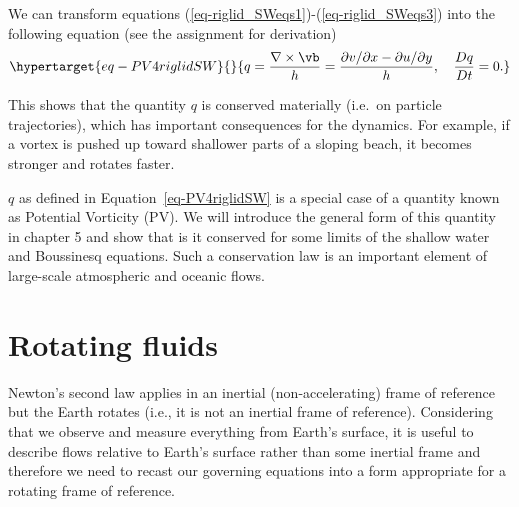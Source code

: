 \documentclass[
  letterpaper,
  twocolumn,
  landscape]{report}
\begin{document}
We can transform equations
(\ref{eq-riglid_SWeqs1})-(\ref{eq-riglid_SWeqs3}) into the following
equation (see the assignment for derivation)
\begin{equation}\protect\hypertarget{eq-PV4riglidSW}{}{q = \frac{\nabla \times \vb}{h} = \frac{\partial v/\partial x - \partial u/\partial y}{h}, \quad  \frac{D q}{D t} = 0. }\label{eq-PV4riglidSW}\end{equation}

This shows that the quantity \(q\) is conserved materially (i.e.~on
particle trajectories), which has important consequences for the
dynamics. For example, if a vortex is pushed up toward shallower parts
of a sloping beach, it becomes stronger and rotates faster.

\begin{tcolorbox}[enhanced jigsaw, toprule=.15mm, left=2mm, opacityback=0, breakable, arc=.35mm, colback=white, rightrule=.15mm, bottomrule=.15mm, colframe=quarto-callout-note-color-frame, leftrule=.75mm]
\begin{minipage}[t]{5.5mm}
\textcolor{quarto-callout-note-color}{\faInfo}
\end{minipage}%
\begin{minipage}[t]{\textwidth - 5.5mm}

\(q\) as defined in Equation~\ref{eq-PV4riglidSW} is a special case of a
quantity known as Potential Vorticity (PV). We will introduce the
general form of this quantity in chapter 5 and show that is it conserved
for some limits of the shallow water and Boussinesq equations. Such a
conservation law is an important element of large-scale atmospheric and
oceanic flows.

\end{minipage}%
\end{tcolorbox}

\hypertarget{sec-chap:rotation}{%
\chapter{Rotating fluids}\label{sec-chap:rotation}}

Newton's second law applies in an inertial (non-accelerating) frame of
reference but the Earth rotates (i.e., it is not an inertial frame of
reference). Considering that we observe and measure everything from
Earth's surface, it is useful to describe flows relative to Earth's
surface rather than some inertial frame and therefore we need to recast
our governing equations into a form appropriate for a rotating frame of
reference.
\end{document}
